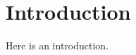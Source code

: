 \section{Introduction}
\label{sec:paperB:introduction}
Here is an introduction\cite{Mittelbach2005}.

